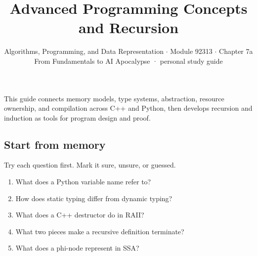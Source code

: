 \documentclass[11pt]{article}
\title{\sffamily\bfseries\color{FAUblue}Advanced Programming Concepts and Recursion}
\author{Algorithms, Programming, and Data Representation \ensuremath{\cdot} Module 92313 \ensuremath{\cdot} Chapter 7a\\[2pt]\small From Fundamentals to AI Apocalypse · personal study guide}
\date{}
\begin{document}
\maketitle
\begingroup\footnotesize\setlength{\parskip}{0pt}\tableofcontents\endgroup
\clearpage

{\large This guide connects memory models, type systems, abstraction, resource ownership, and compilation across C++ and Python, then develops recursion and induction as tools for program design and proof.}


\begin{keepsection}
\section{Start from memory}

Try each question first. Mark it sure, unsure, or guessed.

\begin{enumerate}
\item What does a Python variable name refer to?
\item How does static typing differ from dynamic typing?
\item What does a C++ destructor do in RAII?
\item What two pieces make a recursive definition terminate?
\item What does a phi-node represent in SSA?
\end{enumerate}

\end{keepsection}
\end{document}
